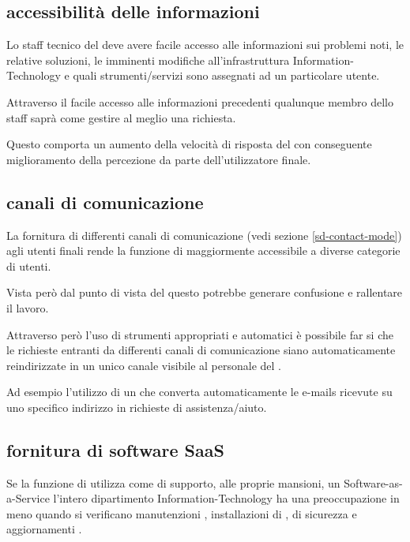 \subsection[Accessibilità delle informazioni]{accessibilità delle informazioni}
Lo staff tecnico del  deve avere facile accesso alle informazioni sui problemi noti, le relative soluzioni, le imminenti modifiche all'infrastruttura \acs{Information-Technology} e quali strumenti/servizi sono assegnati ad un particolare utente.

Attraverso il facile accesso alle informazioni precedenti qualunque membro dello staff saprà come gestire al meglio una richiesta.

Questo comporta un aumento della velocità di risposta del  con conseguente miglioramento della percezione da parte dell'utilizzatore finale.

\subsection[Canali di comunicazione]{canali di comunicazione}
La fornitura di differenti canali di comunicazione (vedi sezione \ref{sd-contact-mode}) agli utenti finali rende la funzione di  maggiormente accessibile a diverse categorie di utenti.

Vista però dal punto di vista del  questo potrebbe generare confusione e rallentare il lavoro.

Attraverso però l'uso di strumenti appropriati e automatici è possibile far si che le richieste entranti da differenti canali di comunicazione siano automaticamente reindirizzate in un unico canale visibile al personale del .

Ad esempio l'utilizzo di un  che converta automaticamente le e-mails ricevute su uno specifico indirizzo in richieste di assistenza/aiuto.

\subsection[Fornitura di software SaaS]{fornitura di software SaaS}
Se la funzione di  utilizza come  di supporto, alle proprie mansioni, un \ac{Software-as-a-Service} l'intero dipartimento \acs{Information-Technology} ha una preoccupazione in meno quando si verificano manutenzioni , installazioni di ,  di sicurezza e aggiornamenti .

